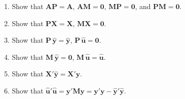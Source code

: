 \documentclass[12pt]{article}
\newcommand{\X}{\ensuremath{\mathbf{X}}}
\newcommand{\y}{\ensuremath{\mathbf{y}}}
\newcommand{\M}{\ensuremath{\mathbf{M}}}
\renewcommand{\P}{\ensuremath{\mathbf{P}}}
\begin{document}
\begin{enumerate}
\begin{enumerate}
\item Show that $\mathbf{A}\P=\mathbf{A}$, $\mathbf{A}\M=\mathbf{0}$, $\M\P=\mathbf{0}$, and $\P\M=\mathbf{0}.$

\item Show that $\P\X=\X$, $\M\X=\mathbf{0}$.

\item Show that $\P\,\widehat{\y}=\widehat{\y}$, $\P\,\widehat{\mathbf{u}}=\mathbf{0}.$  

\item Show that $\M\,\widehat{\y}=\mathbf{0}$, $\M\,\widehat{\mathbf{u}}=\widehat{\mathbf{u}}$.  

\item Show that $\X'\widehat{\y}=\X'\y$.  

\item Show that $\widehat{\mathbf{u}}'\widehat{\mathbf{u}}=\y'\M\y=\y'\y-\widehat{\y}'\widehat{\y}$.  

\end{enumerate}



\end{enumerate}
\end{document}
